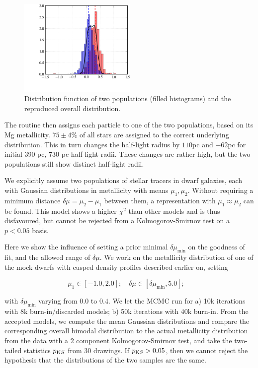\begin{figure}
\begin{center}
\hspace{-7mm}
\includegraphics[width=0.5\textwidth]{fig/pymcmetals.png}
\caption{Distribution function of two populations (filled histograms) and the reproduced overall distribution.}
\label{fig:pops}
\end{center}
\end{figure}

The routine then assigns each particle to one of the two populations,
based on its Mg metallicity. $75\pm4\%$ of all stars are assigned to
the correct underlying distribution. This in turn changes the
half-light radius by $110$pc and $-62$pc for initial 390 pc, 730 pc
half light radii. These changes are rather high, but the two
populations still show distinct half-light radii.


We explicitly assume two populations of stellar tracers in dwarf
galaxies, each with Gaussian distributions in metallicity with means
$\mu_1,\mu_2$. Without requiring a minimum distance $\delta
\mu=\mu_2-\mu_1$ between them, a representation with $\mu_1 \approx
\mu_2$ can be found. This model shows a higher $\chi^2$ than other
models and is thus disfavoured, but cannot be rejected from a
Kolmogorov-Smirnov test on a $p<0.05$ basis.

Here we show the influence of setting a prior minimal
$\delta\mu_{\min}$ on the goodness of fit, and the allowed range of
$\delta \mu$. We work on the metallicity distribution of one of the
mock dwarfs with cusped density profiles described earlier on, setting

\begin{equation}
\mu_1\in[-1.0,2.0];\quad \delta \mu \in [ \delta\mu_{\min}, 5.0];\quad 
\end{equation}

with $\delta\mu_{\min}$ varying from $0.0$ to $0.4$. We let the MCMC
run for a) 10k iterations with 8k burn-in/discarded models; b) 50k
iterations with 40k burn-in. From the accepted models, we compute the
mean Gaussian distributions and compare the corresponding overall
bimodal distribution to the actual metallicity distribution from the
data with a 2 component Kolmogorov-Smirnov test, and take the
two-tailed statistics $p_{\text KS}$ from 30 drawings. If $p_{\text KS}>0.05$, then we
cannot reject the hypothesis that the distributions of the two samples
are the same.

